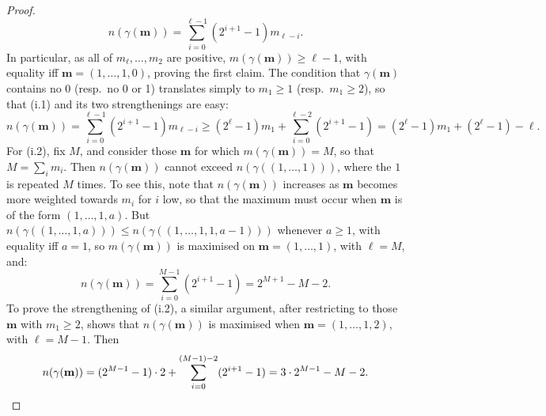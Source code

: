 \documentclass[10pt]{article}
\newcommand{\minDim}{m}
\begin{document}
\begin{KoszulSequenceCombinatorics}
\begin{proof}
\[n(\gamma(\textbf{m}))=\sum_{i=0}^{\ell-1}\left(2^{i+1}-1\right)m_{\ell-i}.\]
In particular, as all of $m_\ell,\ldots,m_2$ are positive, $\minDim(\gamma(\textbf{m}))\geq\ell-1$, with equality iff $\textbf{m}=(1,\ldots,1,0)$, proving the first claim.
The condition that $\gamma(\textbf{m})$ contains no 0 (resp.\ no 0 or 1) translates simply to $m_1\geq1$ (resp.\ $m_1\geq2$), so that \textup{(i.1)} and its two strengthenings are easy:
\[n(\gamma(\textbf{m}))=\sum_{i=0}^{\ell-1}\left(2^{i+1}-1\right)m_{\ell-i}\geq(2^{\ell}-1)m_1+ \sum_{i=0}^{\ell-2}\left(2^{i+1}-1\right)
=(2^{\ell}-1)m_1+(2^\ell-1)-\ell.\]
For \textup{(i.2)}, fix $M$, and consider those $\textbf{m}$ for which $\minDim(\gamma(\textbf{m}))=M$, so that $M=\sum_im_i$. Then $n(\gamma(\textbf{m}))$ cannot exceed $n(\gamma((1,\ldots,1)))$, where the $1$ is repeated $M$ times. To see this, note that $n(\gamma(\textbf{m}))$ increases as $\textbf{m}$ becomes more weighted towards $m_i$ for $i$ low, so that the maximum must occur when $\textbf{m}$ is of the form $(1,\ldots,1,a)$. But $n(\gamma((1,\ldots,1,a)))\leq n(\gamma((1,\ldots,1,1,a-1)))$ whenever $a\geq1$, with equality iff $a=1$, so $\minDim(\gamma(\textbf{m}))$ is maximised on $\textbf{m}=(1,\ldots,1)$, with $\ell=M$, and:
\[n(\gamma(\textbf{m}))=\sum_{i=0}^{M-1}(2^{i+1}-1)=2^{M+1}-M-2.\]
To prove the strengthening of \textup{(i.2)}, a similar argument, after restricting to those $\textbf{m}$ with $m_1\geq2$, shows that $n(\gamma(\textbf{m}))$ is maximised when $\textbf{m}=(1,\ldots,1,2)$, with $\ell=M-1$. Then
\[n(\gamma(\textbf{m}))=(2^{M-1}-1)\cdot2+\sum_{i=0}^{(M-1)-2}(2^{i+1}-1)=3\cdot2^{M-1}-M-2.\qedhere\]
\end{proof}
%

\end{KoszulSequenceCombinatorics}
\end{document}
